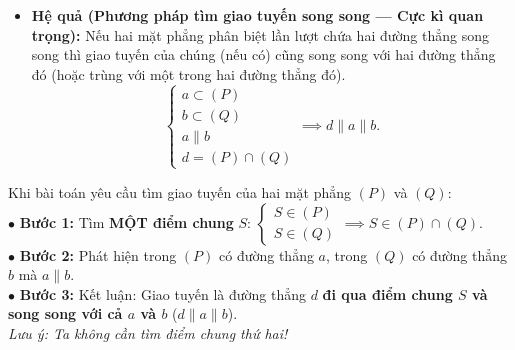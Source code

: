\documentclass[12pt, a4paper]{article}
\begin{document}
\begin{center}
\end{center}

\begin{itemize}
    \item \textbf{Hệ quả (Phương pháp tìm giao tuyến song song --- Cực kì quan trọng):}
    Nếu hai mặt phẳng phân biệt lần lượt chứa hai đường thẳng song song thì giao tuyến của chúng (nếu có) cũng song song với hai đường thẳng đó (hoặc trùng với một trong hai đường thẳng đó).
    $$\begin{cases} a \subset (P) \\ b \subset (Q) \\ a \parallel b \\ d = (P) \cap (Q) \end{cases} \implies d \parallel a \parallel b.$$
\end{itemize}

\begin{scaffoldbox}
    Khi bài toán yêu cầu tìm giao tuyến của hai mặt phẳng $(P)$ và $(Q)$:\\
    $\bullet$ \textbf{Bước 1:} Tìm \textbf{MỘT điểm chung} $S$: $\begin{cases} S \in (P) \\ S \in (Q) \end{cases} \implies S \in (P) \cap (Q)$.\\
    $\bullet$ \textbf{Bước 2:} Phát hiện trong $(P)$ có đường thẳng $a$, trong $(Q)$ có đường thẳng $b$ mà $a \parallel b$.\\
    $\bullet$ \textbf{Bước 3:} Kết luận: Giao tuyến là đường thẳng $d$ \textbf{đi qua điểm chung $S$ và song song với cả $a$ và $b$} ($d \parallel a \parallel b$).\\
    \textit{Lưu ý: Ta không cần tìm điểm chung thứ hai!}
\end{scaffoldbox}
\end{document}
